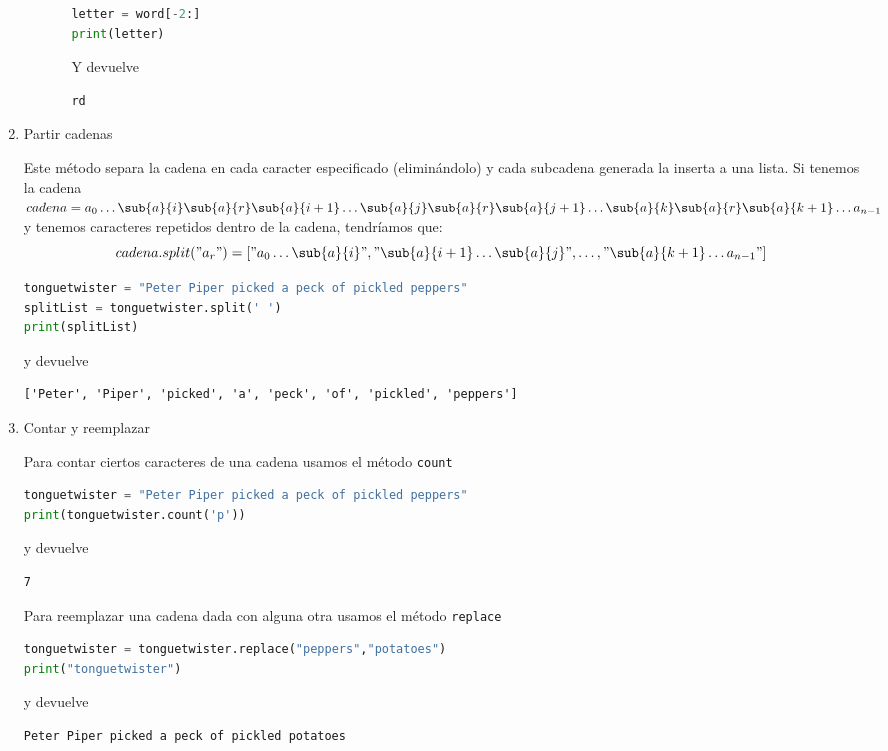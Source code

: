 \begin{enumerate}
\begin{enumerate}
\begin{itemize}
\begin{lstlisting}[language={python}]
letter = word[-2:]
print(letter)
		\end{lstlisting}
		Y devuelve
		\begin{lstlisting}[language={[latex]tex}]
rd
		\end{lstlisting}
	\end{itemize}
	    \end{enumerate}
	    \item Partir cadenas\par 
	    Este método separa la cadena en cada caracter especificado (eliminándolo) y cada subcadena generada la inserta a una lista. Si tenemos la cadena $ cadena = a_{0}\ldots \sub{a}{i}\sub{a}{r}\sub{a}{i+1}\ldots\sub{a}{j}\sub{a}{r}\sub{a}{j+1}\ldots\sub{a}{k}\sub{a}{r}\sub{a}{k+1}\ldots  a_{n-1} $ y tenemos caracteres repetidos dentro de la cadena, tendríamos que:
	\[ cadena.split("a_{r}")=["a_{0}\ldots \sub{a}{i}","\sub{a}{i+1}\ldots\sub{a}{j}",\ldots, "\sub{a}{k+1}\ldots a_{n-1}"] \]
	\begin{lstlisting}[language={python}]
tonguetwister = "Peter Piper picked a peck of pickled peppers"
splitList = tonguetwister.split(' ')
print(splitList)
	\end{lstlisting}
	y devuelve
	\begin{lstlisting}[language={[latex]tex}]
['Peter', 'Piper', 'picked', 'a', 'peck', 'of', 'pickled', 'peppers']
	\end{lstlisting}
	\item Contar y reemplazar\par 
	Para contar ciertos caracteres de una cadena usamos el método \texttt{count}
	\begin{lstlisting}[language={python}]
tonguetwister = "Peter Piper picked a peck of pickled peppers"
print(tonguetwister.count('p'))
	\end{lstlisting}
	y devuelve
	\begin{lstlisting}[language={[latex]tex}]
7
	\end{lstlisting}
	Para reemplazar una cadena dada con alguna otra usamos el método \texttt{replace}
	\begin{lstlisting}[language={python}]
tonguetwister = tonguetwister.replace("peppers","potatoes")
print("tonguetwister")
	\end{lstlisting}
	y devuelve
	\begin{lstlisting}[language={[latex]tex}]
Peter Piper picked a peck of pickled potatoes
	\end{lstlisting}
	\end{enumerate}
